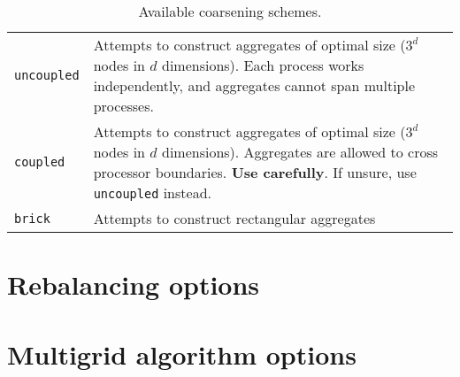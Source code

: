 \begin{table}[h!]
  \begin{center}
    \begin{tabular}{p{5.0cm} p{10cm}}
      \toprule
      \verb!uncoupled! & Attempts to construct aggregates of optimal size ($3^d$
                         nodes in $d$ dimensions). Each process works independently, and
                         aggregates cannot span multiple processes.\\
      \verb!coupled!   & Attempts to construct aggregates of optimal size ($3^d$
                         nodes in $d$ dimensions). Aggregates are allowed to
                         cross processor boundaries. \textbf{Use carefully}. If
                         unsure, use \verb!uncoupled! instead.\\
      \verb!brick!     & Attempts to construct rectangular aggregates \\
      \bottomrule
    \end{tabular}
    \caption{Available coarsening schemes. }
\label{t:aggregation}
  \end{center}
\end{table}



\section{Rebalancing options}
\label{sec:options_rebalancing}



\section{Multigrid algorithm options}
\label{sec:options_mg}


